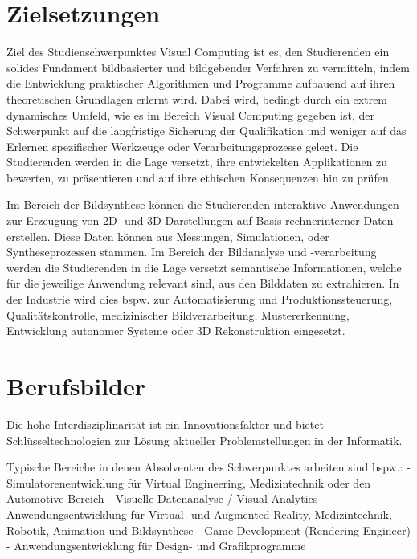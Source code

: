 \section*{Zielsetzungen\label{/mi-2017/modulbeschreibungen-master/schwerpunkt-visual-computing}}\label{zielsetzungenpathlabelmi-2017modulbeschreibungen-masterschwerpunkt-visual-computing}

Ziel des Studienschwerpunktes Visual Computing ist es, den Studierenden
ein solides Fundament bildbasierter und bildgebender Verfahren zu
vermitteln, indem die Entwicklung praktischer Algorithmen und Programme
aufbauend auf ihren theoretischen Grundlagen erlernt wird. Dabei wird,
bedingt durch ein extrem dynamisches Umfeld, wie es im Bereich Visual
Computing gegeben ist, der Schwerpunkt auf die langfristige Sicherung
der Qualifikation und weniger auf das Erlernen spezifischer Werkzeuge
oder Verarbeitungsprozesse gelegt. Die Studierenden werden in die Lage
versetzt, ihre entwickelten Applikationen zu bewerten, zu präsentieren
und auf ihre ethischen Konsequenzen hin zu prüfen.

Im Bereich der Bildsynthese können die Studierenden interaktive
Anwendungen zur Erzeugung von 2D- und 3D-Darstellungen auf Basis
rechnerinterner Daten erstellen. Diese Daten können aus Messungen,
Simulationen, oder Syntheseprozessen stammen. Im Bereich der Bildanalyse
und -verarbeitung werden die Studierenden in die Lage versetzt
semantische Informationen, welche für die jeweilige Anwendung relevant
sind, aus den Bilddaten zu extrahieren. In der Industrie wird dies bspw.
zur Automatisierung und Produktionssteuerung, Qualitätskontrolle,
medizinischer Bildverarbeitung, Mustererkennung, Entwicklung autonomer
Systeme oder 3D Rekonstruktion eingesetzt.

\section*{Berufsbilder\label{/mi-2017/modulbeschreibungen-master/schwerpunkt-visual-computing}}\label{berufsbilderpathlabelmi-2017modulbeschreibungen-masterschwerpunkt-visual-computing}

Die hohe Interdisziplinarität ist ein Innovationsfaktor und bietet
Schlüsseltechnologien zur Lösung aktueller Problemstellungen in der
Informatik.

Typische Bereiche in denen Absolventen des Schwerpunktes arbeiten sind
bspw.: - Simulatorenentwicklung für Virtual Engineering, Medizintechnik
oder den Automotive Bereich - Visuelle Datenanalyse / Visual Analytics -
Anwendungsentwicklung für Virtual- und Augmented Reality,
Medizintechnik, Robotik, Animation und Bildsynthese - Game Development
(Rendering Engineer) - Anwendungsentwicklung für Design- und
Grafikprogramme

